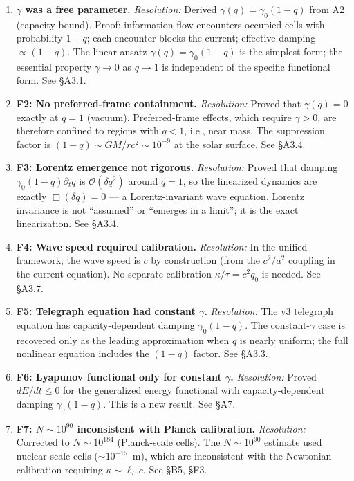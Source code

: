 \documentclass[reprint]{revtex4-2}
\begin{document}
\begin{enumerate}[leftmargin=*, label=\textbf{F1:}]
\item \textbf{$\gamma$ was a free parameter.} \textit{Resolution:} Derived $\gamma(q)=\gamma_0(1-q)$ from A2 (capacity bound). Proof: information flow encounters occupied cells with probability $1-q$; each encounter blocks the current; effective damping $\propto (1-q)$. The linear ansatz $\gamma(q)=\gamma_0(1-q)$ is the simplest form; the essential property $\gamma\to 0$ as $q\to 1$ is independent of the specific functional form. See \S A3.1.

\item \textbf{F2: No preferred-frame containment.} \textit{Resolution:} Proved that $\gamma(q)=0$ exactly at $q=1$ (vacuum). Preferred-frame effects, which require $\gamma>0$, are therefore confined to regions with $q<1$, i.e., near mass. The suppression factor is $(1-q) \sim GM/rc^2 \sim 10^{-9}$ at the solar surface. See \S A3.4.

\item \textbf{F3: Lorentz emergence not rigorous.} \textit{Resolution:} Proved that damping $\gamma_0(1-q)\partial_t q$ is $\mathcal{O}(\delta q^2)$ around $q=1$, so the linearized dynamics are exactly $\Box(\delta q)=0$ --- a Lorentz-invariant wave equation. Lorentz invariance is not ``assumed'' or ``emerges in a limit''; it is the exact linearization. See \S A3.4.

\item \textbf{F4: Wave speed required calibration.} \textit{Resolution:} In the unified framework, the wave speed is $c$ by construction (from the $c^2/a^2$ coupling in the current equation). No separate calibration $\kappa/\tau = c^2 q_0$ is needed. See \S A3.7.

\item \textbf{F5: Telegraph equation had constant $\gamma$.} \textit{Resolution:} The v3 telegraph equation has capacity-dependent damping $\gamma_0(1-q)$. The constant-$\gamma$ case is recovered only as the leading approximation when $q$ is nearly uniform; the full nonlinear equation includes the $(1-q)$ factor. See \S A3.3.

\item \textbf{F6: Lyapunov functional only for constant $\gamma$.} \textit{Resolution:} Proved $dE/dt \le 0$ for the generalized energy functional with capacity-dependent damping $\gamma_0(1-q)$. This is a new result. See \S A7.

\item \textbf{F7: $N\sim 10^{90}$ inconsistent with Planck calibration.} \textit{Resolution:} Corrected to $N\sim 10^{184}$ (Planck-scale cells). The $N\sim 10^{90}$ estimate used nuclear-scale cells ($\sim 10^{-15}$~m), which are inconsistent with the Newtonian calibration requiring $\kappa \sim \ell_P c$. See \S B5, \S F3.
\end{enumerate}
\end{document}
